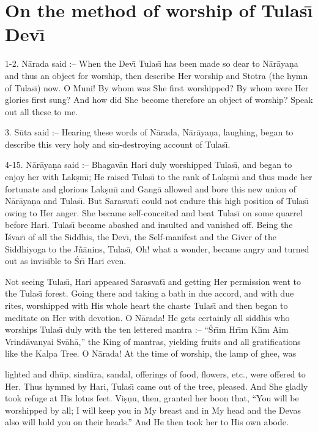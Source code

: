 \chapter{On the method of worship of Tulas\={\i} Dev\={\i}}

1-2. N\=arada said :-- When the Dev\={\i} Tulas\={\i} has been made so dear to N\=ar\=aya\d{n}a and thus an object for worship, then describe Her worship and Stotra (the hymn of Tulas\={\i}) now. O Muni! By whom was She first worshipped? By whom were Her glories first sung? And how did She become therefore an object of worship? Speak out all these to me.

3. S\=uta said :-- Hearing these words of N\=arada, N\=ar\=aya\d{n}a, laughing, began to describe this very holy and sin-destroying account of Tulas\={\i}.

4-15. N\=ar\=aya\d{n}a said :-- Bhagav\=an Hari duly worshipped Tulas\={\i}, and began to enjoy her with Lak\d{s}m\={\i}; He raised Tulas\={\i} to the rank of Lak\d{s}m\={\i} and thus made her fortunate and glorious Lak\d{s}m\={\i} and Gang\=a allowed and bore this new union of N\=ar\=aya\d{n}a and Tulas\={\i}. But Sarasvat\={\i} could not endure this high position of Tulas\={\i} owing to Her anger. She became self-conceited and beat Tulas\={\i} on some quarrel before Hari. Tulas\={\i} became abashed and insulted and vanished off. Being the \=I\'svar\={\i} of all the Siddhis, the Dev\={\i}, the Self-manifest and the Giver of the Siddhiyoga to the J\~n\=anins, Tulas\={\i}, Oh! what a wonder, became angry and turned out as invisible to \'Sr\={\i} Hari even.

Not seeing Tulas\={\i}, Hari appeased Sarasvat\={\i} and getting Her permission went to the Tulas\={\i} forest. Going there and taking a bath in due accord, and with due rites, worshipped with His whole heart the chaste Tulas\={\i} and then began to meditate on Her with devotion. O N\=arada! He gets certainly all siddhis who worships Tulas\={\i} duly with the ten lettered mantra :-- ``\'Sr\={\i}m Hr\={\i}m Kl\={\i}m Aim Vrind\=avanyai Sv\=ah\=a,'' the King of mantras, yielding fruits and all gratifications like the Kalpa Tree. O N\=arada! At the time of worship, the lamp of ghee, was

lighted and dh\=up, sind\=ura, sandal, offerings of food, flowers, etc., were offered to Her. Thus hymned by Hari, Tulas\={\i} came out of the tree, pleased. And She gladly took refuge at His lotus feet. Vi\d{s}\d{n}u, then, granted her boon that, ``You will be worshipped by all; I will keep you in My breast and in My head and the Devas also will hold you on their heads.'' And He then took her to His own abode.

